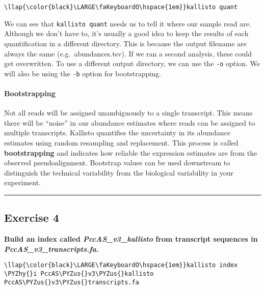 \documentclass[11pt]{article}
\def\PYZus{\char`\_}
\def\PYZhy{\char`\-}
\begin{document}
\begin{terminalinput}
\begin{Verbatim}[commandchars=\\\{\}]
\llap{\color{black}\LARGE\faKeyboardO\hspace{1em}}kallisto quant
\end{Verbatim}
\end{terminalinput}



    We can see that \texttt{kallisto\ quant} needs us to tell it where our
sample read are. Although we don't have to, it's usually a good idea to
keep the results of each quantification in a different directory. This
is because the output filename are always the same
(e.g.~abundances.tsv). If we ran a second analysis, these could get
overwritten. To use a different output directory, we can use the
\texttt{-o} option. We will also be using the \texttt{-b} option for
bootstrapping.

    \hypertarget{bootstrapping}{%
\paragraph{Bootstrapping}\label{bootstrapping}}

Not all reads will be assigned unambiguously to a single transcript.
This means there will be ``noise'' in our abundance estimates where
reads can be assigned to multiple transcripts. Kallisto quantifies the
uncertainty in its abundance estimates using random resampling and
replacement. This process is called \textbf{bootstrapping} and indicates
how reliable the expression estimates are from the observed
pseudoalignment. Bootstrap values can be used downstream to distinguish
the technical variability from the biological variability in your
experiment.

    \begin{center}\rule{0.5\linewidth}{.4pt}\end{center}

    \hypertarget{exercise-4}{%
\subsection{Exercise 4}\label{exercise-4}}

    \textbf{Build an index called \textit{PccAS\_v3\_kallisto} from transcript
sequences in \textit{PccAS\_v3\_transcripts.fa}.}





\begin{terminalinput}
\begin{Verbatim}[commandchars=\\\{\}]
\llap{\color{black}\LARGE\faKeyboardO\hspace{1em}}kallisto index \PYZhy{}i PccAS\PYZus{}v3\PYZus{}kallisto PccAS\PYZus{}v3\PYZus{}transcripts.fa
\end{Verbatim}
\end{terminalinput}
\end{document}
